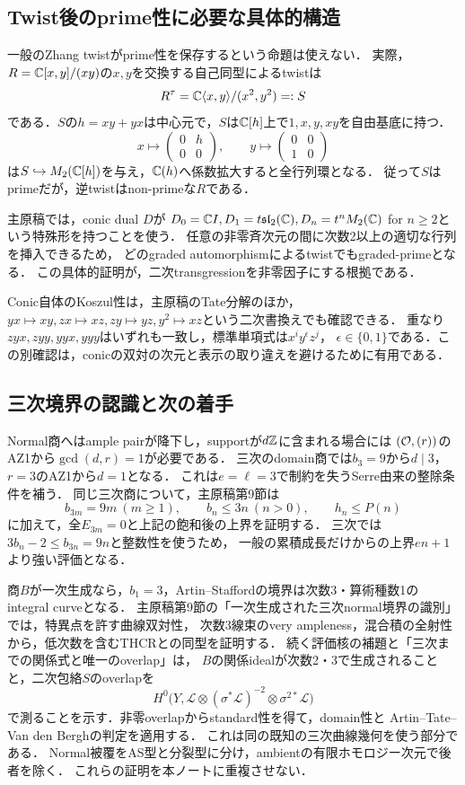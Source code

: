 \documentclass[11pt,a4paper]{ltjsarticle}
\begin{document}
\subsection{Twist後のprime性に必要な具体的構造}
一般のZhang twistがprime性を保存するという命題は使えない．
実際，$R=\mathbb C[x,y]/(xy)$の$x,y$を交換する自己同型によるtwistは
\[
 R^\tau=\mathbb C\langle x,y\rangle/(x^2,y^2)=:S
\]
である．$S$の$h=xy+yx$は中心元で，$S$は$\mathbb C[h]$上で$1,x,y,xy$を自由基底に持つ．
\[
 x\longmapsto\begin{pmatrix}0&h\\0&0\end{pmatrix},\qquad
 y\longmapsto\begin{pmatrix}0&0\\1&0\end{pmatrix}
\]
は$S\hookrightarrow M_2(\mathbb C[h])$を与え，$\mathbb C(h)$へ係数拡大すると全行列環となる．
従って$S$はprimeだが，逆twistはnon-primeな$R$である．

主原稿では，conic dual $D$が
$D_0=\mathbb C I,D_1=t\mathfrak{sl}_2(\mathbb C),D_n=t^nM_2(\mathbb C)$ for $n\geq2$という特殊形を持つことを使う．
任意の非零斉次元の間に次数2以上の適切な行列を挿入できるため，
どのgraded automorphismによるtwistでもgraded-primeとなる．
この具体的証明が，二次transgressionを非零因子にする根拠である．

Conic自体のKoszul性は，主原稿のTate分解のほか，
$yx\mapsto xy,zx\mapsto xz,zy\mapsto yz,y^2\mapsto xz$という二次書換えでも確認できる．
重なり$zyx,zyy,yyx,yyy$はいずれも一致し，標準単項式は$x^iy^\epsilon z^j$，
$\epsilon\in\{0,1\}$である．この別確認は，conicの双対の次元と表示の取り違えを避けるために有用である．

\subsection{三次境界の認識と次の着手}
Normal商へはample pairが降下し，supportが$d\mathbb Z$に含まれる場合には
$(\mathcal O,(r))$のAZ1から$\gcd(d,r)=1$が必要である．
三次のdomain商では$b_3=9$から$d\mid3$，$r=3$のAZ1から$d=1$となる．
これは$e=\ell=3$で制約を失うSerre由来の整除条件を補う．
同じ三次商について，主原稿第9節は
\[
 b_{3m}=9m\ (m\geq1),\qquad b_n\leq3n\ (n>0),\qquad h_n\leq P(n)
\]
に加えて，全$E_{3m}=0$と上記の飽和後の上界を証明する．
三次では$3b_n-2\leq b_{3n}=9n$と整数性を使うため，
一般の累積成長だけからの上界$en+1$より強い評価となる．

商$B$が一次生成なら，$b_1=3$，Artin--Staffordの境界は次数3・算術種数1のintegral curveとなる．
主原稿第9節の「一次生成された三次normal境界の識別」では，特異点を許す曲線双対性，
次数3線束のvery ampleness，混合積の全射性から，低次数を含むTHCRとの同型を証明する．
続く評価核の補題と「三次までの関係式と唯一のoverlap」は，
$B$の関係idealが次数2・3で生成されることと，二次包絡$S$のoverlapを
\[
 H^0\bigl(Y,\mathcal L\otimes(\sigma^*\mathcal L)^{-2}\otimes\sigma^{2*}\mathcal L\bigr)
\]
で測ることを示す．非零overlapからstandard性を得て，domain性と
Artin--Tate--Van den Berghの判定\cite[Theorem 1]{ATV1990}を適用する．
これは同\cite[Theorem 6.6, \S7]{ATV1990}の既知の三次曲線幾何を使う部分である．
Normal被覆をAS型と分裂型に分け，ambientの有限ホモロジー次元で後者を除く．
これらの証明を本ノートに重複させない．
\end{document}
